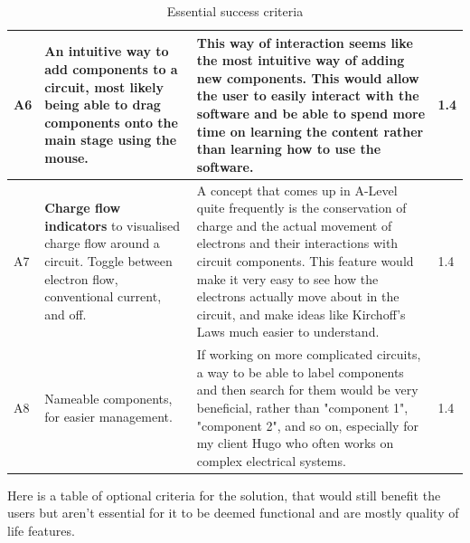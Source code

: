 \documentclass[11pt]{article}
\begin{document}
\begin{table}[!ht]
\begin{tabular}{|l|m{187pt}|m{188pt}|l|}
                    A6 & An intuitive way to add components to a circuit, most likely being able to drag components onto the main stage using the mouse. & This way of interaction seems like the most intuitive way of adding new components. This would allow the user to easily interact with the software and be able to spend more time on learning the content rather than learning how to use the software. & 1.4 \\ \hline
                    A7 & \textbf{Charge flow indicators} to visualised charge flow around a circuit. Toggle between electron flow, conventional current, and off. & A concept that comes up in A-Level quite frequently is the conservation of charge and the actual movement of electrons and their interactions with circuit components. This feature would make it very easy to see how the electrons actually move about in the circuit, and make ideas like Kirchoff's Laws much easier to understand. & 1.4 \\ \hline
                    A8 & Nameable components, for easier management. & If working on more complicated circuits, a way to be able to label components and then search for them would be very beneficial, rather than "component 1", "component 2", and so on, especially for my client Hugo who often works on complex electrical systems. & 1.4 \\ \hline
                \end{tabular}
                \caption{Essential success criteria}
                \label{tbl:essential_succ_crit}
            \end{table}



            \pagebreak

            Here is a table of optional criteria for the solution, that would still benefit the users but aren't essential for it to be deemed functional and are mostly quality of life features.
            
\end{document}
